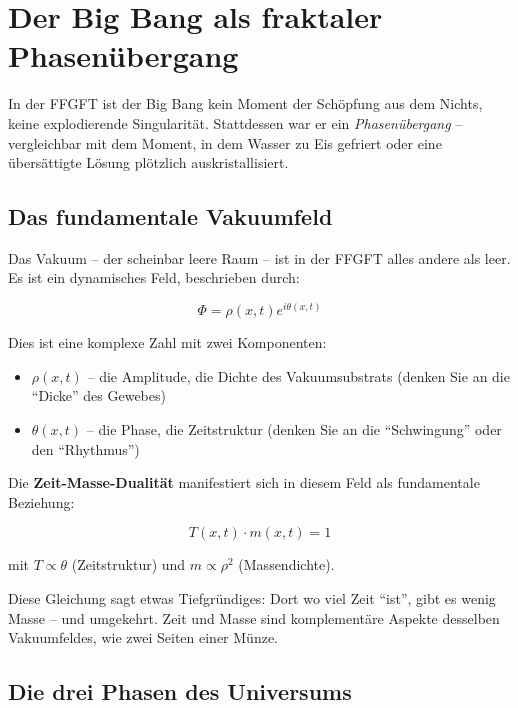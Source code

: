 \section{Der Big Bang als fraktaler Phasenübergang}

In der FFGFT ist der Big Bang kein Moment der Schöpfung aus dem Nichts, keine explodierende Singularität. Stattdessen war er ein \textit{Phasenübergang} -- vergleichbar mit dem Moment, in dem Wasser zu Eis gefriert oder eine übersättigte Lösung plötzlich auskristallisiert.

\subsection{Das fundamentale Vakuumfeld}

Das Vakuum -- der scheinbar leere Raum -- ist in der FFGFT alles andere als leer. Es ist ein dynamisches Feld, beschrieben durch:

\begin{equation}
\Phi = \rho(x,t) e^{i\theta(x,t)}
\end{equation}

Dies ist eine komplexe Zahl mit zwei Komponenten:
\begin{itemize}[leftmargin=*]
\item $\rho(x,t)$ -- die Amplitude, die Dichte des Vakuumsubstrats (denken Sie an die \enquote{Dicke} des Gewebes)
\item $\theta(x,t)$ -- die Phase, die Zeitstruktur (denken Sie an die \enquote{Schwingung} oder den \enquote{Rhythmus})
\end{itemize}

Die \textbf{Zeit-Masse-Dualität} manifestiert sich in diesem Feld als fundamentale Beziehung:

\begin{equation}
T(x,t) \cdot m(x,t) = 1
\end{equation}

mit $T \propto \theta$ (Zeitstruktur) und $m \propto \rho^2$ (Massendichte).

Diese Gleichung sagt etwas Tiefgründiges: Dort wo viel Zeit \enquote{ist}, gibt es wenig Masse -- und umgekehrt. Zeit und Masse sind komplementäre Aspekte desselben Vakuumfeldes, wie zwei Seiten einer Münze.

\subsection{Die drei Phasen des Universums}

